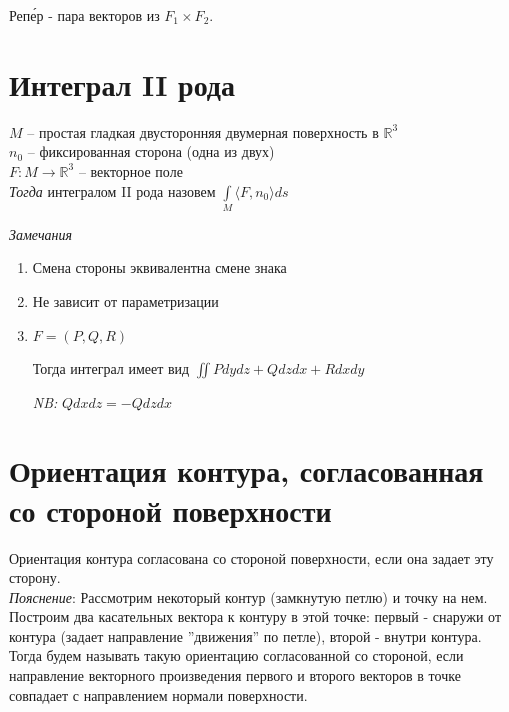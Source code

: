 \documentclass[paper=a4, fontsize=17pt]{article}
\begin{document}
	Реп\'{е}р - пара векторов из $F_1 \times F_2$. 
	
	\section{Интеграл II рода}
	
	$M$ -- простая гладкая двусторонняя двумерная поверхность в $\mathbb{R}^3$\\
	$n_0$ -- фиксированная сторона (одна из двух)\\
	$F : M \rightarrow \mathbb{R}^3$ -- векторное поле\\
	
	\emph{Тогда} интегралом II рода назовем $\int\limits_{M} \langle F, n_0 \rangle ds$
	
	\emph{Замечания}
	\begin{enumerate}
		\item Смена стороны эквивалентна смене знака
		\item Не зависит от параметризации
		\item 
		$F=(P, Q, R)$
		
		Тогда интеграл имеет вид $\iint P dydz + Q dzdx + R dxdy$
		
		\emph{NB:} $Q dxdz = -Q dzdx$
	\end{enumerate}
	
	\section{Ориентация контура, согласованная со стороной поверхности}
	
	Ориентация контура согласована со стороной поверхности, если она задает эту сторону.\\
	
	\emph{Пояснение}: 
	Рассмотрим некоторый контур (замкнутую петлю) и точку на нем. Построим два касательных вектора к контуру в этой точке: первый - снаружи от контура (задает направление ''движения'' по петле), второй - внутри контура. Тогда будем называть такую ориентацию согласованной со стороной, если направление векторного произведения первого и второго векторов в точке совпадает с направлением нормали поверхности.
	
	\begin{center}
	\end{center}
\end{document}
